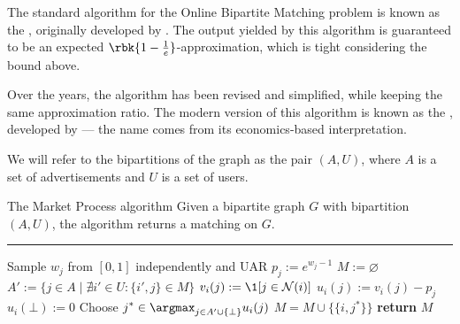 \documentclass[a4paper, 12pt]{report}
\begin{document}
    The standard algorithm for the Online Bipartite Matching problem is known as the , originally developed by \textcite{kvv}. The output yielded by this algorithm is guaranteed to be an expected $\rbk{1 - \tfrac{1}{e}}$-approximation, which is tight considering the bound above.

    Over the years, the algorithm has been revised and simplified, while keeping the same approximation ratio. The modern version of this algorithm is known as the , developed by \textcite{eden} --- the name comes from its economics-based interpretation.

    We will refer to the bipartitions of the graph as the pair $(A, U)$, where $A$ is a set of advertisements and $U$ is a set of users.

    \begin{framedalgo}{The Market Process algorithm}
        Given a bipartite graph $G$ with bipartition $(A, U)$, the algorithm returns a matching on $G$. \\
        \hrule

        \quad
        \begin{algorithmic}[1]
                    \State Sample $w_j$ from $[0,1]$ independently and UAR
                    \State $p_j := e^{w_j - 1}$ 
                \EndFor
                \State $M := \varnothing$
                        \State $A' := \{j \in A \mid \nexists i' \in U : \{i', j \} \in M\}$ 
                            \State $v_i(j) := \1[j \in \mathcal N(i)]$ 
                            \State $u_i(j) := v_i(j) - p_j$ 
                        \EndFor
                        \State $u_i(\bot) := 0$ 
                         
                            \State Choose $\displaystyle j^* \in \argmax_{j \in A' \cup \{\bot\}}{u_i(j)}$ 
                            \State $M = M \cup \{\{i, j^*\}\}$
                        \EndIf
                    \EndFor
                \State \textbf{return} $M$
            \EndFunction
        \end{algorithmic}
    \end{framedalgo}
\end{document}
